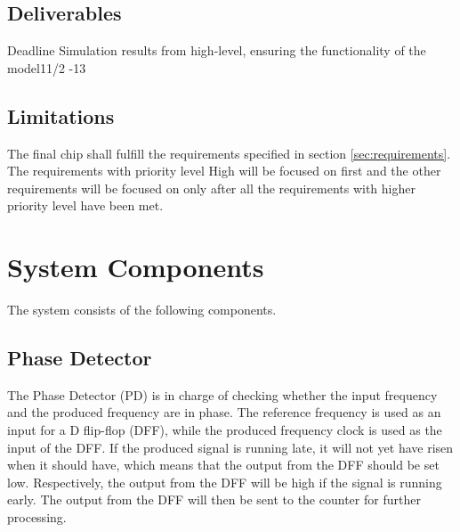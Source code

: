 \documentclass[a4paper,12pt]{article} \usepackage{graphicx}
\begin{document}
\subsection{Deliverables}

\begin{LIPSleveranslista}
                     {Deadline}
                     {Simulation results from high-level, ensuring the functionality of the model}{11/2 -13}
\end{LIPSleveranslista}


\subsection{Limitations}
The final chip shall fulfill the requirements specified in section
\ref{sec:requirements}.
The requirements with priority level High will be focused on first and the other
requirements
will be focused on only after all the requirements with higher priority level
have been met.

\section{System Components}

The system consists of the following components.

\subsection{Phase Detector}
The Phase Detector (PD) is in charge of checking whether the input frequency 
and the produced frequency are in phase. The reference frequency is used as an 
input for a D flip-flop (DFF), while the produced frequency clock is used as 
the input of the DFF. If the produced signal is running late, it will not yet 
have risen when it should have, which means that the output from the DFF 
should be set low. Respectively, the output from the DFF will be high if the 
signal is running early. The output from the DFF will then be sent to the 
counter for further processing.
\end{document}
